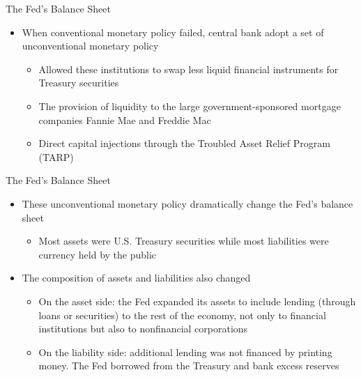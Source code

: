 \documentclass[aspectratio=1610]{beamer}
\begin{document}
\begin{frame}[wide]{The Fed’s Balance Sheet}
	\begin{itemize}
		\item When conventional monetary policy failed, central bank adopt a set of unconventional monetary policy
		\begin{itemize}
			\item Allowed these institutions to swap less liquid financial instruments for Treasury securities
			\item The provision of liquidity to the large government-sponsored mortgage companies Fannie Mae and Freddie Mac
			\item Direct capital injections through the Troubled Asset Relief Program (TARP) 
		\end{itemize} 
	\end{itemize}
\end{frame}

\begin{frame}[wide]{The Fed’s Balance Sheet}
	\begin{itemize}
		\item These unconventional monetary policy dramatically change the Fed’s balance sheet
		\begin{itemize}
			\item Most assets were U.S. Treasury securities while most liabilities were currency held by the public
		\end{itemize}
		\item The composition of assets and liabilities also changed
		\begin{itemize}
			\item On the asset side: the Fed expanded its assets to include lending (through loans or securities) to the rest of the economy, not only to financial institutions but also to nonfinancial corporations
			\item On the liability side: additional lending was not financed by printing money.
			The Fed borrowed from the Treasury and bank excess reserves
		\end{itemize}
	\end{itemize}
\end{frame}
\end{document}
